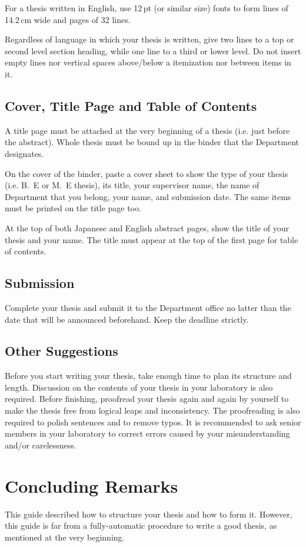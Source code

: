 For a thesis written in English, use 12\,pt (or similar size) fonts to form
{\EM lines of 14.2\,cm wide and pages of 32 lines}.

Regardless of language in which your thesis is written, give two lines to a
top or second level section heading, while one line to a third or lower
level.  Do not insert empty lines nor vertical spaces above/below a
itemization nor between items in it.

\subsection{Cover, Title Page and Table of Contents}\label{subsec-title}
A title page must be attached at the very beginning of a thesis (i.e. just
before the abstract).  Whole thesis must be bound up in the binder that the
Department designates.

On the cover of the binder, paste a cover sheet to show the type of your
thesis (i.e. B.~E or M.~E thesis), its title, your supervisor name, the name
of Department that you belong, your name, and submission date.  The
same items must be printed on the title page too.

At the top of both Japanese and English abstract pages, show the title of
your thesis and your name.  The title must appear at the top of the first
page for table of contents.

\subsection{Submission}\label{subsec-submission}
Complete your thesis and submit it to the Department office no latter than
the date that will be announced beforehand.  Keep the deadline strictly.

\subsection{Other Suggestions}\label{subsec-others}
Before you start writing your thesis, take enough time to plan its structure
and length.  Discussion on the contents of your thesis in your laboratory is
also required.  Before finishing, proofread your thesis again and again by
yourself to make the thesis free from logical leaps and inconsistency.  The
proofreading is also required to polish sentences and to remove typos.  It
is recommended to ask senior members in your laboratory to correct errors
caused by your misunderstanding and/or carelessness.

\section{Concluding Remarks}\label{sec-conclusion}
This guide described how to structure your thesis and how to form it.
However, this guide is far from a fully-automatic procedure to write a good
thesis, as mentioned at the very beginning.

